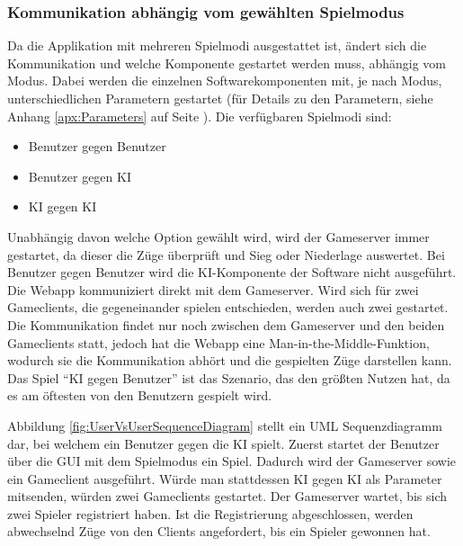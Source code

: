 \documentclass[12pt,a4paper,bibliography=totocnumbered,listof=totocnumbered]{article}
\begin{document}
\subsubsection{Kommunikation abhängig vom gewählten Spielmodus}
\label{chap:NetworkModie}
Da die Applikation mit mehreren Spielmodi ausgestattet ist, ändert sich die Kommunikation und welche Komponente gestartet werden muss, abhängig vom Modus.
Dabei werden die einzelnen Softwarekomponenten mit, je nach Modus, unterschiedlichen Parametern gestartet (für Details zu den Parametern, siehe Anhang \ref{apx:Parameters}
auf Seite \pageref{apx:Parameters}).
Die verfügbaren Spielmodi sind:
\begin{itemize}
    \item Benutzer gegen Benutzer
    \item Benutzer gegen \ac{KI}
    \item \ac{KI} gegen \ac{KI}
\end{itemize}
Unabhängig davon welche Option gewählt wird, wird der Gameserver immer gestartet, da dieser die Züge überprüft und Sieg oder Niederlage auswertet.
Bei Benutzer gegen Benutzer wird die \ac{KI}-Komponente der Software nicht ausgeführt. Die Webapp kommuniziert direkt mit dem Gameserver.
Wird sich für zwei Gameclients, die gegeneinander spielen entschieden, werden auch zwei gestartet.
Die Kommunikation findet nur noch zwischen dem Gameserver und den beiden Gameclients statt, jedoch hat die Webapp eine Man-in-the-Middle-Funktion,
wodurch sie die Kommunikation abhört und die gespielten Züge darstellen kann.
Das Spiel ``\ac{KI} gegen Benutzer'' ist das Szenario, das den größten Nutzen hat, da es am öftesten von den Benutzern gespielt wird.

Abbildung \ref{fig:UserVsUserSequenceDiagram} stellt ein \ac{UML} Sequenzdiagramm dar, bei welchem ein Benutzer gegen die \ac{KI} spielt.
Zuerst startet der Benutzer über die \ac{GUI} mit dem Spielmodus ein Spiel. Dadurch wird der Gameserver sowie ein
Gameclient ausgeführt. Würde man stattdessen \ac{KI} gegen \ac{KI} als Parameter mitsenden, würden zwei Gameclients gestartet. 
Der Gameserver wartet, bis sich zwei Spieler registriert haben. Ist die Registrierung abgeschlossen, werden
abwechselnd Züge von den Clients angefordert, bis ein Spieler gewonnen hat.
\end{document}
